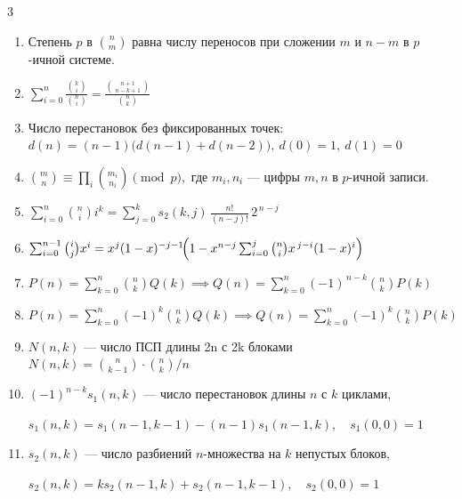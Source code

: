 \documentclass[8pt,a4paper,landscape,twosided]{extarticle}
\begin{document}
\begin{multicols*}{3}
\begin{enumerate}
\item %
Степень $p$ в $\binom{n}{m}$ равна числу переносов при сложении $m$ и $n-m$ в $p$-ичной системе.

\item %
$\sum_{i=0}^{n}\frac{\binom{k}{i}}{\binom{n}{i}}
=\frac{\binom{n+1}{\,n-k+1\,}}{\binom{n}{k}}$

\item %
Число перестановок без фиксированных точек: \\ $d(n)=(n-1)\bigl(d(n-1)+d(n-2)\bigr),\  d(0)=1,\ d(1)=0$

\item %
$\binom{m}{n}\equiv\prod_i\binom{m_i}{n_i}\pmod p,$
\quad где $m_i,n_i$ — цифры $m,n$ в $p$-ичной записи.

\item %
$\sum_{i=0}^{n}\binom{n}{i}i^k
=\sum_{j=0}^{k}s_2(k,j)\,\frac{n!}{(n-j)!}\,2^{\,n-j}$

\item %
$\sum_{i=0}^{n-1}\binom{i}{j}x^i
= x^j(1-x)^{-j-1}\!\Bigl(1-x^{n-j}\sum_{i=0}^j\binom{n}{i}x^{\,j-i}(1-x)^i\Bigr)$

\item %
$P(n)=\sum_{k=0}^{n}\binom{n}{k}Q(k) \implies Q(n)=\sum_{k=0}^{n}(-1)^{\,n-k}\binom{n}{k}P(k)$

\item %
$P(n)=\sum_{k=0}^{n}(-1)^k\binom{n}{k}Q(k) \implies Q(n)=\sum_{k=0}^{n}(-1)^k\binom{n}{k}P(k)$

\item %
$N(n, k)$ — число ПСП длины 2n с 2k блоками
$N(n,k) = \binom{n}{k-1} \cdot \binom{n}{k} / n$

\item %
$(-1)^{n-k}s_1(n,k)$ — число перестановок длины $n$ с $k$ циклами,

$s_1(n,k)=s_1(n-1,k-1)-(n-1)s_1(n-1,k),\quad s_1(0,0)=1$

\item %
$s_2(n,k)$ — число разбиений $n$-множества на $k$ непустых блоков,

$s_2(n,k)=ks_2(n-1,k)+s_2(n-1,k-1),\quad s_2(0,0)=1$


\end{enumerate}
\end{multicols*}
\end{document}
